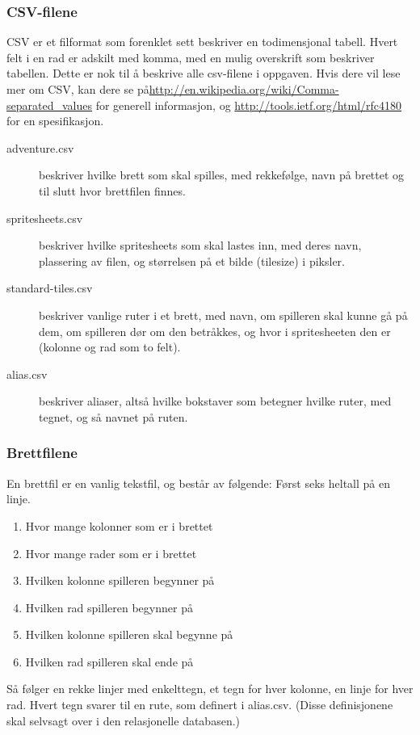 \documentclass[norsk]{article}
\begin{document}
\subsubsection{CSV-filene}
\label{subsec:csv-filene}
CSV er et filformat som forenklet sett beskriver en todimensjonal tabell.
Hvert felt i en rad er adskilt med komma, med en mulig overskrift som beskriver tabellen.
Dette er nok til å beskrive alle csv-filene i oppgaven.
Hvis dere vil lese mer om CSV, kan dere se på\url{http://en.wikipedia.org/wiki/Comma-separated_values} for generell informasjon, og \url{http://tools.ietf.org/html/rfc4180} for en spesifikasjon.

\begin{description}
\item [adventure.csv]      beskriver hvilke brett som skal spilles, med rekkefølge, navn på brettet og til slutt hvor brettfilen finnes.
\item [spritesheets.csv]   beskriver hvilke spritesheets som skal lastes inn, med deres navn, plassering av filen, og størrelsen på et bilde (tilesize) i piksler.
\item [standard-tiles.csv] beskriver vanlige ruter i et brett, med navn, om spilleren skal kunne gå på dem, om spilleren dør om den betråkkes, og hvor i spritesheeten den er (kolonne og rad som to felt).
\item [alias.csv]          beskriver aliaser, altså hvilke bokstaver som betegner hvilke ruter, med tegnet, og så navnet på ruten.
\end{description}

\subsubsection{Brettfilene}
\label{subsec:brettfil}

En brettfil er en vanlig tekstfil, og består av følgende:
Først seks heltall på en linje.
\begin{enumerate}
\item Hvor mange kolonner som er i brettet
\item Hvor mange rader som er i brettet
\item Hvilken kolonne spilleren begynner på
\item Hvilken rad spilleren begynner på
\item Hvilken kolonne spilleren skal begynne på
\item Hvilken rad spilleren skal ende på
\end{enumerate}
Så følger en rekke linjer med enkelttegn, et tegn for hver kolonne, en linje for hver rad.
Hvert tegn svarer til en rute, som definert i alias.csv. (Disse definisjonene skal selvsagt over i den relasjonelle databasen.)
\end{document}
